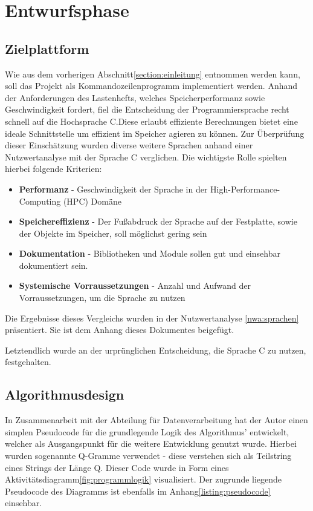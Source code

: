 \section{Entwurfsphase}
\label{section:entwurfsphase}
\subsection{Zielplattform}
Wie aus dem vorherigen Abschnitt\ref{section:einleitung} entnommen werden kann, soll das Projekt als Kommandozeilenprogramm
implementiert werden. Anhand der Anforderungen des Lastenhefts, welches Speicherperformanz sowie Geschwindigkeit fordert,
fiel die Entscheidung der Programmiersprache recht schnell auf die Hochsprache C.Diese erlaubt effiziente Berechnungen bietet eine ideale Schnittstelle um effizient im Speicher agieren zu können.
Zur Überprüfung dieser Einschätzung wurden diverse weitere Sprachen anhand einer
Nutzwertanalyse mit der Sprache C verglichen. Die wichtigste Rolle spielten hierbei folgende Kriterien:
\begin{itemize}
    \item \textbf{Performanz} - Geschwindigkeit der Sprache in der High-Performance-Computing (HPC) Domäne
    \item \textbf{Speichereffizienz} - Der Fußabdruck der Sprache auf der Festplatte, sowie der Objekte im Speicher, soll möglichst gering sein
    \item \textbf{Dokumentation} - Bibliotheken und Module sollen gut und einsehbar dokumentiert sein.
    \item \textbf{Systemische Vorraussetzungen} - Anzahl und Aufwand der Vorraussetzungen, um die Sprache zu nutzen
\end{itemize}

Die Ergebnisse dieses Vergleichs wurden in der Nutzwertanalyse \ref{nwa:sprachen} präsentiert.
Sie ist dem Anhang dieses Dokumentes beigefügt.\par
Letztendlich wurde an der urprünglichen Entscheidung, die Sprache C zu nutzen, festgehalten.

\subsection{Algorithmusdesign}
In Zusammenarbeit mit der Abteilung für Datenverarbeitung hat der Autor einen simplen
Pseudocode für die grundlegende Logik des Algorithmus' entwickelt, welcher als Ausgangspunkt
für die weitere Entwicklung genutzt wurde. Hierbei wurden sogenannte Q-Gramme verwendet - 
diese verstehen sich als Teilstring eines Strings der Länge Q. Dieser Code wurde in Form eines
Aktivitätsdiagramm\ref{fig:programmlogik} visualisiert. Der zugrunde liegende  Pseudocode des Diagramms ist ebenfalls im Anhang\ref{listing:pseudocode} einsehbar.


